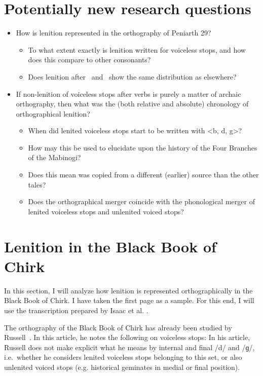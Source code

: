  \section{Potentially new research questions}
 \begin{itemize}
 \item How is lenition represented in the orthography of Peniarth 29?
 \begin{itemize}
 \item To what extent exactly is lenition written for voiceless stops, and how does this compare to other consonants?
 \item Does lenition after \ei\ and \oes\ show the same distribution as elsewhere?
 \end{itemize}
 \item If non-lenition of voiceless stops after verbs is purely a matter of archaic orthography, then what was the (both relative and absolute) chronology of orthographical lenition?
 \begin{itemize}
 \item When did lenited voiceless stops start to be written with <b, d, g>?
 \item How may this be used to elucidate upon the history of the Four Branches of the Mabinogi? \item Does this mean  was copied from a different (earlier) source than the other tales? 
 \item Does the orthographical merger coincide with the phonological merger of lenited voiceless stops and unlenited voiced stops?
 \end{itemize}
 \end{itemize}
 
 \section{Lenition in the Black Book of Chirk}
 
 In this section, I will analyze how lenition is represented orthographically in the Black Book of Chirk. I have taken the first page as a sample. For this end, I will use the transcription prepared by Isaac et al. \parencite*{isaac_rhyddiaith_2013}.
 
 The orthography of the Black Book of Chirk has already been studied by Russell~\parencite*{russell_scribal_1995}. In this article, he notes the following on voiceless stops:  In his article, Russell does not make explicit what he means by internal and final /d/ and /ɡ/, i.e.\ whether he considers lenited voiceless stops belonging to this set, or also unlenited voiced stops (e.g. historical geminates in medial or final position).

